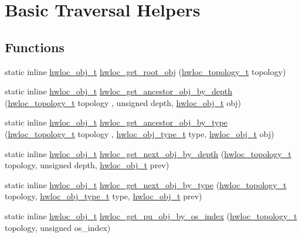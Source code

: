\hypertarget{a00053}{
\section{Basic Traversal Helpers}
\label{a00053}
}
\subsection*{Functions}
\begin{DoxyCompactItemize}
\item 
static inline \hyperlink{a00016}{hwloc\_\-obj\_\-t} \hyperlink{a00053_gadbf58f6e187efbdb3cd9a8e30311b7d7}{hwloc\_\-get\_\-root\_\-obj} (\hyperlink{a00039_ga9d1e76ee15a7dee158b786c30b6a6e38}{hwloc\_\-topology\_\-t} topology) 
\item 
static inline \hyperlink{a00016}{hwloc\_\-obj\_\-t} \hyperlink{a00053_ga9b9d6af74eb0b78b1384aa66dd058ddc}{hwloc\_\-get\_\-ancestor\_\-obj\_\-by\_\-depth} (\hyperlink{a00039_ga9d1e76ee15a7dee158b786c30b6a6e38}{hwloc\_\-topology\_\-t} topology , unsigned depth, \hyperlink{a00016}{hwloc\_\-obj\_\-t} obj) 
\item 
static inline \hyperlink{a00016}{hwloc\_\-obj\_\-t} \hyperlink{a00053_gac93e1a95a71add57ac841daef1b94e5e}{hwloc\_\-get\_\-ancestor\_\-obj\_\-by\_\-type} (\hyperlink{a00039_ga9d1e76ee15a7dee158b786c30b6a6e38}{hwloc\_\-topology\_\-t} topology , \hyperlink{a00041_gacd37bb612667dc437d66bfb175a8dc55}{hwloc\_\-obj\_\-type\_\-t} type, \hyperlink{a00016}{hwloc\_\-obj\_\-t} obj) 
\item 
static inline \hyperlink{a00016}{hwloc\_\-obj\_\-t} \hyperlink{a00053_gab7c1dce3f42ece5bfa621e87cf332418}{hwloc\_\-get\_\-next\_\-obj\_\-by\_\-depth} (\hyperlink{a00039_ga9d1e76ee15a7dee158b786c30b6a6e38}{hwloc\_\-topology\_\-t} topology, unsigned depth, \hyperlink{a00016}{hwloc\_\-obj\_\-t} prev)
\item 
static inline \hyperlink{a00016}{hwloc\_\-obj\_\-t} \hyperlink{a00053_ga5f08ceb69375341e73563cfe2e77534e}{hwloc\_\-get\_\-next\_\-obj\_\-by\_\-type} (\hyperlink{a00039_ga9d1e76ee15a7dee158b786c30b6a6e38}{hwloc\_\-topology\_\-t} topology, \hyperlink{a00041_gacd37bb612667dc437d66bfb175a8dc55}{hwloc\_\-obj\_\-type\_\-t} type, \hyperlink{a00016}{hwloc\_\-obj\_\-t} prev)
\item 
static inline \hyperlink{a00016}{hwloc\_\-obj\_\-t} \hyperlink{a00053_ga0bc54225b65d557c70c7cb5dfb714de7}{hwloc\_\-get\_\-pu\_\-obj\_\-by\_\-os\_\-index} (\hyperlink{a00039_ga9d1e76ee15a7dee158b786c30b6a6e38}{hwloc\_\-topology\_\-t} topology, unsigned os\_\-index) 

\end{DoxyCompactItemize}
